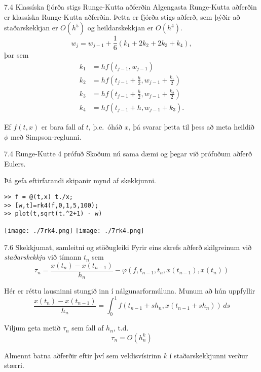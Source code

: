 \begin{frame}{7.4 Klassíska fjórða stigs Runge-Kutta aðferðin}
 Algengasta Runge-Kutta aðferðin er klassíska Runge-Kutta aðferðin. Þetta
 er fjórða stigs aðferð, sem þýðir að staðarskekkjan er $O(h^5)$ og heildarskekkjan er $O(h^4)$.
\pause
$$
 w_{j} = w_{j-1} + \frac 16(k_1 + 2k_2 + 2k_3 + k_4),
 $$
 \pause
 þar sem
 \begin{align*}
  k_1 &= hf(t_{j-1},w_{j-1}) \\
  k_2 &= hf\left(t_{j-1} + \frac h2,w_{j-1}+ \frac{k_1}2\right) \\
  k_3 &= hf\left(t_{j-1} + \frac h2,w_{j-1}+ \frac{k_2}2\right) \\
  k_4 &= hf(t_{j-1} + h,w_{j-1}+ k_3).
 \end{align*}
 
 \pause
 Ef $f(t,x)$ er bara fall af $t$, þ.e.~óháð $x$, þá svarar þetta til þess að meta heildið $\phi$
 með Simpson-reglunni.

\end{frame}

\begin{frame}[fragile]{7.4 Runge-Kutte 4 prófuð}
Skoðum nú sama dæmi og þegar við prófuðum aðferð Eulers.

Þá gefa eftirfarandi skipanir mynd af skekkjunni.
\begin{verbatim}
>> f = @(t,x) t./x;
>> [w,t]=rk4(f,0,1,5,100);
>> plot(t,sqrt(t.^2+1) - w)
\end{verbatim}

{\texttt{[image: ./7rk4.png]}}
{\texttt{[image: ./7rk4.png]}}
\end{frame}


\begin{frame}{7.6 Skekkjumat, samleitni og stöðugleiki} 
Fyrir eins skrefs aðferð skilgreinum við {\it staðarskekkju}
við tímann $t_n$ sem
$$ 
\tau_n = \dfrac{x(t_n)-x(t_{n-1})}{h_n} - 
\varphi(f,t_{n-1},t_n,x(t_{n-1}),x(t_{n})) 
$$

\pause
\smallskip
Hér er réttu lausninni stungið inn í nálgunarformúluna.
Munum að hún uppfyllir 
$$
\dfrac{x(t_n)-x(t_{n-1})}{h_n}
=\int_0^1 f(t_{n-1}+sh_n,x(t_{n-1}+sh_n))\, ds
$$

\pause
\smallskip
Viljum geta metið $\tau_n$ sem fall af $h_n$, t.d.
  $$ 
    \tau_n = O(h_n^k) 
  $$

\pause
\smallskip
Almennt batna aðferðir eftir því sem veldisvísirinn  $k$ 
í staðarskekkjunni verður stærri.
\end{frame}


